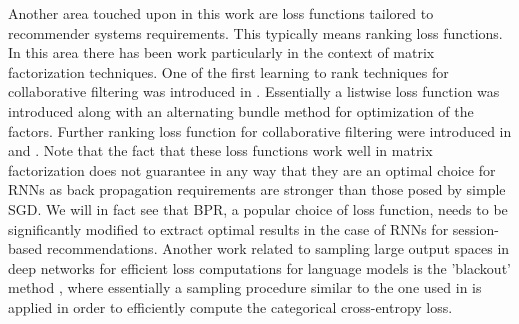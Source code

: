 Another area touched upon in this work are loss functions tailored to recommender systems requirements. This typically means ranking loss functions. In this area there has been work particularly in
the context of matrix factorization techniques. One of the first learning to rank techniques for collaborative filtering was introduced in \cite{weimer2007cofirank}. Essentially a listwise loss function was
introduced along with an alternating bundle method for optimization of the factors. Further ranking
loss function for collaborative filtering were introduced in \cite{shi2012climf} \cite{rendle2012bpr}
and \cite{rendle2012bpr}. Note that the fact that these loss functions work well in matrix factorization does not guarantee in any way that they are an optimal choice for RNNs as back propagation
requirements are stronger than those posed by simple SGD. We will in fact see that BPR, a popular
choice of loss function, needs to be significantly modified to extract optimal results in the case of
RNNs for session-based recommendations. Another work related to sampling large output spaces
in deep networks for efficient loss computations for language models is the ’blackout’ method \cite{ji2015blackout}, where essentially a sampling procedure similar to the one used in \cite{hidasi2015session}
is applied in order to efficiently compute the categorical cross-entropy loss.




